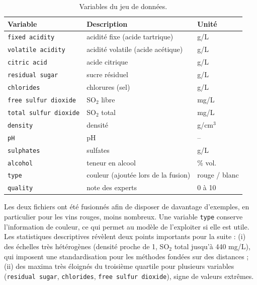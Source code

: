 \documentclass[11pt,a4paper]{article}
\newcommand{\code}[1]{\texttt{#1}}
\begin{document}
\begin{table}[H]
\centering
\caption{Variables du jeu de données.}
\label{tab:variables}
\small
\begin{tabular}{lll}
\toprule
\textbf{Variable} & \textbf{Description} & \textbf{Unité} \\
\midrule
\code{fixed acidity}        & acidité fixe (acide tartrique)        & g/L \\
\code{volatile acidity}     & acidité volatile (acide acétique)      & g/L \\
\code{citric acid}          & acide citrique                         & g/L \\
\code{residual sugar}       & sucre résiduel                         & g/L \\
\code{chlorides}            & chlorures (sel)                        & g/L \\
\code{free sulfur dioxide}  & SO$_2$ libre                           & mg/L \\
\code{total sulfur dioxide} & SO$_2$ total                           & mg/L \\
\code{density}              & densité                                & g/cm$^3$ \\
\code{pH}                   & pH                                     & -- \\
\code{sulphates}            & sulfates                               & g/L \\
\code{alcohol}              & teneur en alcool                       & \% vol. \\
\midrule
\code{type}                 & couleur (ajoutée lors de la fusion)    & rouge / blanc \\
\code{quality}              & note des experts                       & 0 à 10 \\
\bottomrule
\end{tabular}
\end{table}

Les deux fichiers ont été fusionnés afin de disposer de davantage d'exemples, en particulier pour les vins rouges, moins nombreux. Une variable \code{type} conserve l'information de couleur, ce qui permet au modèle de l'exploiter si elle est utile. Les statistiques descriptives révèlent deux points importants pour la suite : (i) des échelles très hétérogènes (densité proche de 1, SO$_2$ total jusqu'à 440 mg/L), qui imposent une standardisation pour les méthodes fondées sur des distances ; (ii) des maxima très éloignés du troisième quartile pour plusieurs variables (\code{residual sugar}, \code{chlorides}, \code{free sulfur dioxide}), signe de valeurs extrêmes.
\end{document}
